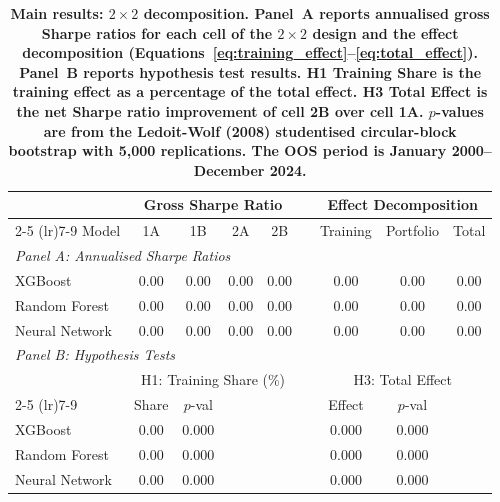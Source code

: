 \begin{table}[t!]
\centering
\begin{tabular}{l cccc c ccc}
\midrule
& \multicolumn{4}{c}{Gross Sharpe Ratio} & & \multicolumn{3}{c}{Effect Decomposition} \\
\cmidrule(lr){2-5} \cmidrule(lr){7-9}
Model & 1A & 1B & 2A & 2B & & Training & Portfolio & Total \\
\midrule
\multicolumn{9}{l}{\it Panel A: Annualised Sharpe Ratios} \\[4pt]
XGBoost       & 0.00 & 0.00 & 0.00 & 0.00 & & 0.00 & 0.00 & 0.00 \\
Random Forest & 0.00 & 0.00 & 0.00 & 0.00 & & 0.00 & 0.00 & 0.00 \\
Neural Network& 0.00 & 0.00 & 0.00 & 0.00 & & 0.00 & 0.00 & 0.00 \\[8pt]
\multicolumn{9}{l}{\it Panel B: Hypothesis Tests} \\[4pt]
& \multicolumn{4}{c}{H1: Training Share (\%)} & & \multicolumn{3}{c}{H3: Total Effect} \\
\cmidrule(lr){2-5} \cmidrule(lr){7-9}
& Share & $p$-val & & & & Effect & $p$-val & \\
XGBoost       & 0.00 & 0.000 & & & & 0.000 & 0.000 & \\
Random Forest & 0.00 & 0.000 & & & & 0.000 & 0.000 & \\
Neural Network& 0.00 & 0.000 & & & & 0.000 & 0.000 & \\
\midrule
\end{tabular}
\caption{\footnotesize \bf Main results: $2\times 2$ decomposition\normalfont. Panel~A reports annualised gross Sharpe ratios for each cell of the $2\times 2$ design and the effect decomposition (Equations~\ref{eq:training_effect}--\ref{eq:total_effect}). Panel~B reports hypothesis test results. H1 Training Share is the training effect as a percentage of the total effect. H3 Total Effect is the net Sharpe ratio improvement of cell 2B over cell 1A. $p$-values are from the Ledoit-Wolf (2008) studentised circular-block bootstrap with 5,000 replications. The OOS period is January 2000--December 2024.}
\label{tab:main_results}
\end{table}
